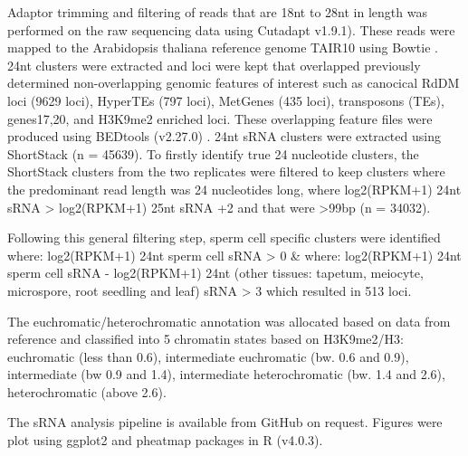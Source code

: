 Adaptor trimming and filtering of reads that are 18nt to 28nt in length was performed on the raw sequencing data using Cutadapt \citep{RN88} v1.9.1). These reads were mapped to the Arabidopsis thaliana reference genome TAIR10 using Bowtie \citep{RN89}. 24nt clusters were extracted and loci were kept that overlapped previously determined non-overlapping genomic features of interest such as canocical RdDM loci (9629 loci), HyperTEs (797 loci), MetGenes (435 loci), transposons (TEs), genes17,20, and H3K9me2 enriched loci. These overlapping feature files were produced using BEDtools (v2.27.0) \citep{RN90}. 24nt sRNA clusters were extracted using ShortStack \citep{RN142} (n = 45639). To firstly identify true 24 nucleotide clusters, the ShortStack clusters from the two replicates were filtered to keep clusters where the predominant read length was 24 nucleotides long, where log2(RPKM+1) 24nt sRNA > log2(RPKM+1) 25nt sRNA +2 and that were >99bp (n = 34032).

Following this general filtering step, sperm cell specific clusters were identified where:
log2(RPKM+1) 24nt sperm cell sRNA > 0 \& where:
log2(RPKM+1) 24nt sperm cell sRNA - log2(RPKM+1) 24nt (other tissues: tapetum, meiocyte, microspore, root seedling and leaf) sRNA > 3 which resulted in 513 loci.

The euchromatic/heterochromatic annotation was allocated based on data from reference \cite{RN183} and classified into 5 chromatin states based on H3K9me2/H3: euchromatic (less than 0.6), intermediate euchromatic (bw. 0.6 and 0.9), intermediate (bw 0.9 and 1.4), intermediate heterochromatic (bw. 1.4 and 2.6), heterochromatic (above 2.6). 

The sRNA analysis pipeline is available from GitHub on request. Figures were plot using ggplot2 and pheatmap packages in R (v4.0.3).

